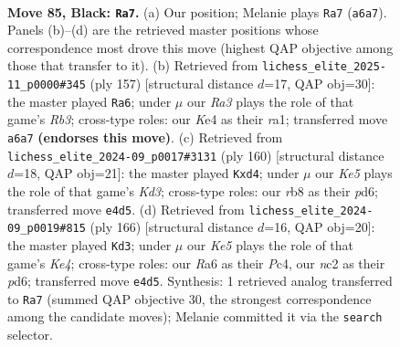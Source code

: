 \documentclass[11pt]{article}
\begin{document}
\clearpage

\begin{figure}[p]\centering
\begin{subfigure}{0.46\textwidth}\centering
\resizebox{\linewidth}{!}{%
\newchessgame
\chessboard[
  setfen={1R6/6p1/r4p2/3P3p/4k2P/6P1/2N5/7K b - - 10 85},
  showmover=false,
  pgfstyle=straightmove, color=movearrow, markmove={a6-a7}
]}
\caption{}
\end{subfigure}\hfill
\begin{subfigure}{0.46\textwidth}\centering
\resizebox{\linewidth}{!}{%
\newchessgame
\chessboard[
  setfen={3k4/3P1K2/1r4p1/7p/7P/6P1/p7/R7 b - - 1 79},
  showmover=false,
  pgfstyle=straightmove, color=movearrow, markmove={b6-a6}
]}
\caption{}
\end{subfigure}
\\[4pt]
\begin{subfigure}{0.46\textwidth}\centering
\resizebox{\linewidth}{!}{%
\newchessgame
\chessboard[
  setfen={8/8/3p1p2/1k3Pp1/3pP1P1/3K4/8/8 w - - 1 81},
  showmover=false,
  pgfstyle=straightmove, color=movearrow, markmove={d3-d4}
]}
\caption{}
\end{subfigure}\hfill
\begin{subfigure}{0.46\textwidth}\centering
\resizebox{\linewidth}{!}{%
\newchessgame
\chessboard[
  setfen={8/5k2/3p4/p4Pp1/P1P1KpP1/8/8/8 w - - 15 84},
  showmover=false,
  pgfstyle=straightmove, color=movearrow, markmove={e4-d3}
]}
\caption{}
\end{subfigure}
\caption{\textbf{Move 85, Black: \texttt{Ra7}.} (a) Our position; Melanie plays \texttt{Ra7} (\texttt{a6a7}). Panels (b)--(d) are the retrieved master positions whose correspondence most drove this move (highest QAP objective among those that transfer to it). (b) Retrieved from \texttt{lichess\_elite\_2025-11\_p0000\#345} (ply 157) [structural distance $d$=17, QAP obj=30]: the master played \texttt{Ra6}; under $\mu$ our \emph{Ra3} plays the role of that game's \emph{Rb3}; cross-type roles: our \emph{K}e4 as their \emph{r}a1; transferred move \texttt{a6a7} \textbf{(endorses this move)}. (c) Retrieved from \texttt{lichess\_elite\_2024-09\_p0017\#3131} (ply 160) [structural distance $d$=18, QAP obj=21]: the master played \texttt{Kxd4}; under $\mu$ our \emph{Ke5} plays the role of that game's \emph{Kd3}; cross-type roles: our \emph{r}b8 as their \emph{p}d6; transferred move \texttt{e4d5}. (d) Retrieved from \texttt{lichess\_elite\_2024-09\_p0019\#815} (ply 166) [structural distance $d$=16, QAP obj=20]: the master played \texttt{Kd3}; under $\mu$ our \emph{Ke5} plays the role of that game's \emph{Ke4}; cross-type roles: our \emph{R}a6 as their \emph{P}c4, our \emph{n}c2 as their \emph{p}d6; transferred move \texttt{e4d5}. Synthesis: 1 retrieved analog transferred to \texttt{Ra7} (summed QAP objective 30, the strongest correspondence among the candidate moves); Melanie committed it via the \texttt{search} selector.}
\label{fig:thought-m169}
\end{figure}
\end{document}
